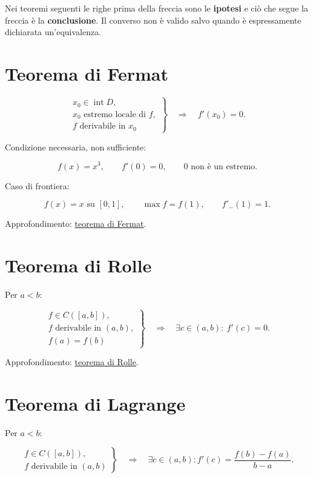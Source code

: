 Nei teoremi seguenti le righe prima della freccia sono le \textbf{ipotesi} e ciò che segue la freccia è la \textbf{conclusione}. Il converso non è valido salvo quando è espressamente dichiarata un'equivalenza.

\section{Teorema di Fermat}\label{teorema-di-fermat}

\[
\displaystyle
\left.
\begin{array}{l}
x_0\in\operatorname{int}D,\\
x_0\text{ estremo locale di }f,\\
f\text{ derivabile in }x_0
\end{array}
\right\}
\quad\Longrightarrow\quad
f'(x_0)=0.
\]

Condizione necessaria, non sufficiente:

\[
\displaystyle
f(x)=x^3,
\qquad
f'(0)=0,
\qquad
0\text{ non è un estremo}.
\]

Caso di frontiera:

\[
\displaystyle
f(x)=x\text{ su }[0,1],
\qquad
\max f=f(1),
\qquad
f'_-(1)=1.
\]

Approfondimento: \href{https://ingegnerismo.it/matematica/teorema-di-fermat/}{teorema di Fermat}.

\section{Teorema di Rolle}\label{teorema-di-rolle}

Per \(a<b\):

\[
\displaystyle
\left.
\begin{array}{l}
f\in C([a,b]),\\
f\text{ derivabile in }(a,b),\\
f(a)=f(b)
\end{array}
\right\}
\quad\Longrightarrow\quad
\exists c\in(a,b):\ f'(c)=0.
\]

Approfondimento: \href{https://ingegnerismo.it/matematica/teorema-di-rolle/}{teorema di Rolle}.

\section{Teorema di Lagrange}\label{teorema-di-lagrange}

Per \(a<b\):

\[
\displaystyle
\left.
\begin{array}{l}
f\in C([a,b]),\\
f\text{ derivabile in }(a,b)
\end{array}
\right\}
\quad\Longrightarrow\quad
\exists c\in(a,b):
f'(c)=\frac{f(b)-f(a)}{b-a}.
\]

